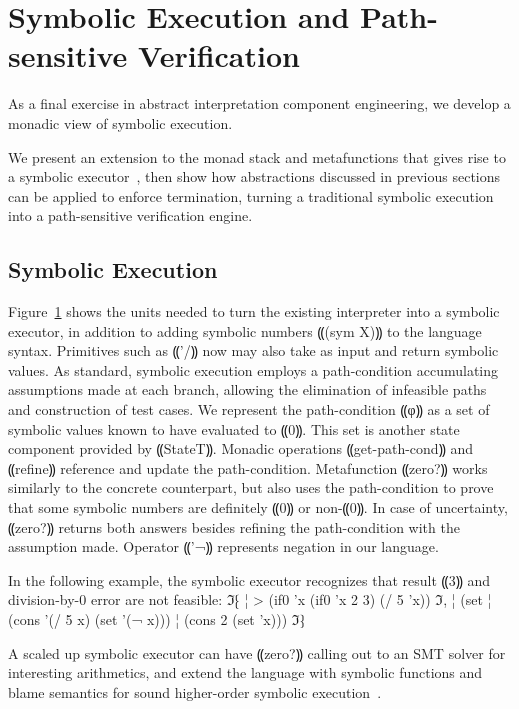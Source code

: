 \section{Symbolic Execution and Path-sensitive Verification}\label{s:symbolic}

As a final exercise in abstract interpretation component engineering, we
develop a monadic view of symbolic execution.

We present an extension to the monad stack and metafunctions that gives rise to
a symbolic executor~\cite{dvanhorn:King1976Symbolic}, then show how
abstractions discussed in previous sections can be applied to enforce
termination, turning a traditional symbolic execution into a path-sensitive
verification engine.

\subsection{Symbolic Execution}
Figure~\ref{s:symbolic} shows the units needed to turn the existing interpreter
into a symbolic executor, in addition to adding symbolic numbers ⸨(sym X)⸩
to the language syntax.
Primitives such as ⸨'/⸩ now may also take as input
and return symbolic values.
As standard, symbolic execution employs a path-condition
accumulating assumptions made at each branch,
allowing the elimination of infeasible paths and construction of test cases.
We represent the path-condition ⸨φ⸩ as a set of symbolic values
known to have evaluated to ⸨0⸩.
This set is another state component provided by ⸨StateT⸩.
Monadic operations ⸨get-path-cond⸩
and ⸨refine⸩ reference and update the path-condition.
Metafunction ⸨zero?⸩ works similarly to the concrete counterpart,
but also uses the path-condition to prove that some symbolic numbers
are definitely ⸨0⸩ or non-⸨0⸩.
In case of uncertainty, ⸨zero?⸩ returns both answers
besides refining the path-condition with the assumption made.
Operator ⸨'¬⸩ represents negation in our language.

In the following example, the symbolic executor recognizes that
result ⸨3⸩ and division-by-0 error are not feasible:
ℑ⁅
¦ > (if0 'x (if0 'x 2 3) (/ 5 'x))
ℑ,
¦ (set
¦    (cons '(/ 5 x) (set '(¬ x)))
¦    (cons 2 (set 'x)))
ℑ⁆

A scaled up symbolic executor can have ⸨zero?⸩ calling out
to an SMT solver for interesting arithmetics,
and extend the language with symbolic functions
and blame semantics for sound higher-order symbolic
execution~\cite{dvanhorn:TobinHochstadt2012Higherorder,dvanhorn:Nguyen2015Relatively}.


